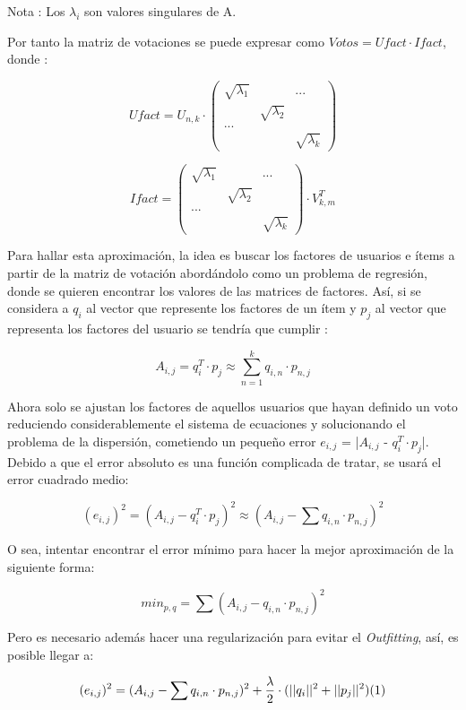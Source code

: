\documentclass{article}
\begin{document}
Nota : Los $\lambda_{i}$ son valores singulares de A.

Por tanto la matriz de votaciones se puede expresar como $Votos = Ufact\cdot Ifact$, donde :

$$
Ufact = U_{n, k} \cdot
\left(
\begin{matrix}
\sqrt{\lambda_{1}} &  & ...\\
& \sqrt{\lambda_{2}}\\
... \\
& & \sqrt{\lambda_{k}}
\end{matrix}
\right)
$$


$$
Ifact =
\left(\begin{matrix}
\sqrt{\lambda_{1}} &  & ...\\
& \sqrt{\lambda_{2}}\\
... \\
& & \sqrt{\lambda_{k}}
\end{matrix}
\right)
\cdot
V^T_{k, m}  
$$

Para hallar esta aproximación, la idea es buscar los 
factores de usuarios e ítems a partir de la matriz 
de votación abordándolo como un problema de 
regresión, donde se quieren encontrar los valores 
de las matrices de factores. Así, si se 
considera a $q_{i}$ al vector que represente los 
factores de un ítem y $p_{j}$ al vector que representa 
los factores del usuario se tendría que cumplir :

$$
A_{i, j} = q^T_{i} \cdot p_{j} \approx \sum_{n = 1}^{k} q_{i, n}\cdot p_{n, j}
$$

Ahora solo se ajustan los factores de 
aquellos usuarios que hayan definido un voto 
reduciendo considerablemente el sistema de 
ecuaciones y solucionando el problema de la 
dispersión, cometiendo un pequeño error $e_{i, j}$ = |$A_{i, j}$ - $q^T_{i} \cdot p_{j}$|. Debido a que el error absoluto es una 
función complicada de tratar, se usará el error 
cuadrado medio:

$$
(e_{i, j})^2 = (A_{i, j} - q^T_{i} \cdot p_{j})^2 \approx (A_{i, j} - \sum q_{i, n}\cdot p_{n, j})^2
$$

O sea, intentar encontrar el error mínimo para hacer la mejor aproximación de la siguiente forma:

$$
min_{p, q} = \sum (A_{i, j} - q_{i, n}\cdot p_{n, j})^2
$$

Pero es necesario además hacer una regularización para evitar el \textit{Outfitting}, así, es posible llegar a:

$$
(e_{i, j})^2 = (A_{i, j} - \sum q_{i, n}\cdot p_{n, j})^2 + \frac{\lambda}{2} \cdot (||q_{i}||^2 + ||p_{j}||^2) \space (1)
$$
\end{document}

